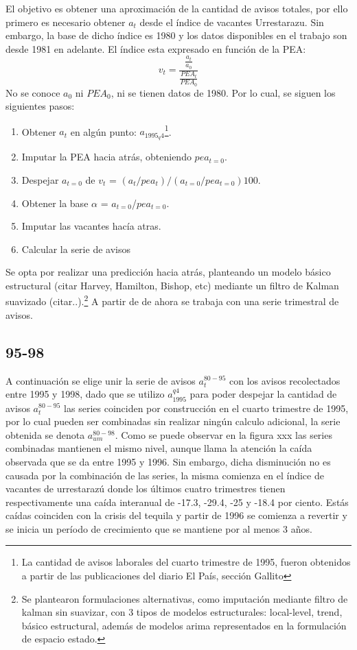 \documentclass[12pt,twoside]{reedthesis}
\providecommand{\tightlist}{%
  \setlength{\itemsep}{0pt}\setlength{\parskip}{0pt}}
\begin{document}
El objetivo es obtener una aproximación de la cantidad de avisos totales, por ello primero es necesario obtener \(a_t\) desde el índice de vacantes Urrestarazu. Sin embargo, la base de dicho índice es 1980 y los datos disponibles en el trabajo son desde 1981 en adelante. El índice esta expresado en función de la PEA:
\begin{equation}
v_t = \frac{\frac{a_t}{a_0}}{\frac{PEA_t}{PEA_0}}
\end{equation}
No se conoce \(a_0\) ni \(PEA_0\), ni se tienen datos de 1980. Por lo cual, se siguen los siguientes pasos:
\begin{enumerate}
\def\labelenumi{\arabic{enumi}.}
\tightlist
\item
  Obtener \(a_t\) en algún punto: \(a_{1995_q4}\)\footnote{La cantidad de avisos laborales del cuarto trimestre de 1995, fueron obtenidos a partir de las publicaciones del diario El País, sección Gallito}.
\item
  Imputar la PEA hacia atrás, obteniendo \(pea_{t=0}\).
\item
  Despejar \(a_{t=0}\) de
  \(v_t\) = \((a_t/pea_t)/(a_{t=0}/pea_{t=0})100\).
\item
  Obtener la base \(\alpha\) = \(a_{t=0}\)/\(pea_{t=0}\).
\item
  Imputar las vacantes hacía atras.
\item
  Calcular la serie de avisos
\end{enumerate}
Se opta por realizar una predicción hacia atrás, planteando un modelo básico estructural (citar Harvey, Hamilton, Bishop, etc) mediante un filtro de Kalman suavizado (citar..).\footnote{Se plantearon formulaciones alternativas, como imputación mediante filtro de kalman sin suavizar, con 3 tipos de modelos estructurales: local-level, trend, básico estructural, además de modelos arima representados en la formulación de espacio estado.} A partir de de ahora se trabaja con una serie trimestral de avisos.

\hypertarget{section-1}{%
\subsection{95-98}\label{section-1}}

A continuación se elige unir la serie de avisos \(a_t^{80-95}\) con los avisos recolectados entre 1995 y 1998, dado que se utilizo \(a_{1995}^{q4}\) para poder despejar la cantidad de avisos \(a_t^{80-95}\) las series coinciden por construcción en el cuarto trimestre de 1995, por lo cual pueden ser combinadas sin realizar ningún calculo adicional, la serie obtenida se denota \(a_{um}^{80-98}\). Como se puede observar en la figura xxx las series combinadas mantienen el mismo nivel, aunque llama la atención la caída observada que se da entre 1995 y 1996. Sin embargo, dicha disminución no es causada por la combinación de las series, la misma comienza en el índice de vacantes de urrestarazú donde los últimos cuatro trimestres tienen respectivamente una caída interanual de -17.3, -29.4, -25 y -18.4 por ciento. Estás caídas coinciden con la crisis del tequila y partir de 1996 se comienza a revertir y se inicia un período de crecimiento que se mantiene por al menos 3 años.
\end{document}
